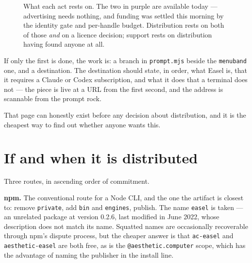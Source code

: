 \documentclass[10pt,letterpaper,twocolumn]{article}
\newcommand{\code}[1]{\texttt{#1}}
\begin{document}
\begin{figure}[t]
\centering
\footnotesize
{}
\caption{What each act rests on. The two in purple are available today ---
advertising needs nothing, and funding was settled this morning by the identity
gate and per-handle budget. Distribution rests on both of those \emph{and} on a
licence decision; support rests on distribution having found anyone at all.}
\label{fig:acts}
\end{figure}

If only the first is done, the work is: a branch in \code{prompt.mjs} beside the
\code{menuband} one, and a destination. The destination should state, in order,
what Easel is, that it requires a Claude or Codex subscription, and what it
does that a terminal does not --- the piece is live at a URL from the first
second, and the address is scannable from the prompt rock.

That page can honestly exist before any decision about distribution, and it is
the cheapest way to find out whether anyone wants this.

\section{If and when it is distributed}

Three routes, in ascending order of commitment.

\textbf{npm.} The conventional route for a Node CLI, and the one the artifact is
closest to: remove \code{private}, add \code{bin} and \code{engines}, publish.
The name \code{easel} is taken --- an unrelated package at version 0.2.6, last
modified in June 2022, whose description does not match its name. Squatted
names are occasionally recoverable through npm's dispute process, but the
cheaper answer is that \code{ac-easel} and \code{aesthetic-easel} are both free,
as is the \code{@aesthetic.computer} scope, which has the advantage of naming
the publisher in the install line.
\end{document}
